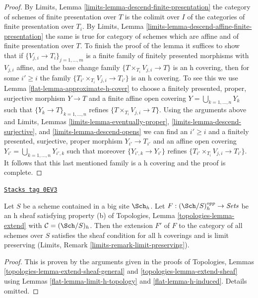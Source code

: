 \begin{proof}

By Limits, Lemma \ref{limits-lemma-descend-finite-presentation}
the category of schemes of finite presentation over $T$ is the
colimit over $I$ of the categories of finite presentation over $T_i$. By
Limits, Lemma \ref{limits-lemma-descend-affine-finite-presentation}
the same is true for category of schemes which are affine and
of finite presentation over $T$.
To finish the proof of the lemma it suffices to show that if
$\{V_{j, i} \to T_i\}_{j = 1, \ldots, m}$ is a finite family of
finitely presented morphisms with $V_{j, i}$ affine, and the
base change family $\{T \times_{T_i} V_{j, i} \to T\}$ is
an h covering, then for some $i' \geq i$ the family
$\{T_{i'} \times_{T_i} V_{j, i} \to T_{i'}\}$ is an h covering.
To see this we use Lemma \ref{flat-lemma-approximate-h-cover} to
choose a finitely presented, proper, surjective
morphism $Y \to T$ and a finite affine open covering
$Y = \bigcup_{k = 1, \ldots, n} Y_k$ such that
$\{Y_k \to T\}_{k = 1, \ldots, n}$ refines
$\{T \times_{T_i} V_{j, i} \to T\}$.
Using the arguments above and
Limits, Lemmas \ref{limits-lemma-eventually-proper},
\ref{limits-lemma-descend-surjective}, and
\ref{limits-lemma-descend-opens}
we can find an $i' \geq i$ and a finitely presented, surjective, proper
morphism $Y_{i'} \to T_{i'}$ and an affine open covering
$Y_{i'} = \bigcup_{k = 1, \ldots, n} Y_{i', k}$
such that moreover $\{Y_{i', k} \to Y_{i'}\}$ refines
$\{T_{i'} \times_{T_i} V_{j, i} \to T_{i'}\}$.
It follows that this last mentioned family is
a h covering and the proof is complete.
\end{proof}

\begin{lemma}
\label{flat-lemma-extend-sheaf-h}
\href{https://stacks.math.columbia.edu/tag/0EV3}{\texttt{Stacks tag 0EV3}}

Let $S$ be a scheme contained in a big site $\Sch_h$.
Let $F : (\Sch/S)_h^{opp} \to \textit{Sets}$ be an h sheaf satisfying
property (b) of Topologies, Lemma \ref{topologies-lemma-extend}
with $\mathcal{C} = (\Sch/S)_h$.
Then the extension $F'$ of $F$ to the category of all
schemes over $S$ satisfies the sheaf condition for all h coverings
and is limit preserving (Limits, Remark \ref{limits-remark-limit-preserving}).
\end{lemma}

\begin{proof}

This is proven by the arguments given in the proofs of
Topologies, Lemmas \ref{topologies-lemma-extend-sheaf-general} and
\ref{topologies-lemma-extend-sheaf} using
Lemmas \ref{flat-lemma-limit-h-topology} and \ref{flat-lemma-h-induced}.
Details omitted.
\end{proof}

